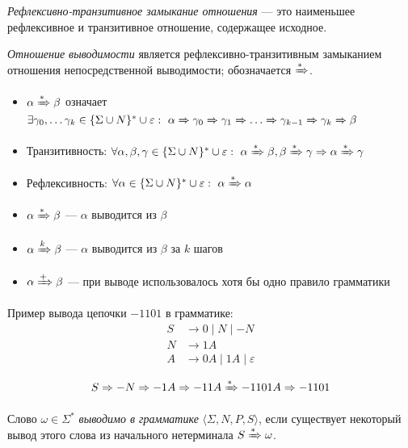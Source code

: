 \begin{definition}
  \textit{Рефлексивно-транзитивное замыкание отношения} --- это наименьшее рефлексивное и транзитивное отношение, содержащее исходное.
\end{definition}

\begin{definition}
\textit{Отношение выводимости} является рефлексивно-транзитивным замыканием отношения непосредственной выводимости; обозначается $\derives$.
\begin{itemize}
  \item $\alpha \derives \beta$ означает $\exists \gamma_0, \dots \gamma_k \in \{\Sigma \cup N\}^* \cup {\varepsilon}: \ \alpha \derives[] \gamma_0 \derives[] \gamma_1 \derives[] \dots \derives[] \gamma_{k-1} \derives[] \gamma_{k} \derives[] \beta$
  \item Транзитивность: $\forall \alpha, \beta, \gamma \in \{\Sigma \cup N\}^* \cup {\varepsilon}: \ \alpha \derives \beta, \beta \derives \gamma \Rightarrow \alpha \derives \gamma$
  \item Рефлексивность: $\forall \alpha \in \{\Sigma \cup N\}^* \cup {\varepsilon}: \ \alpha \derives \alpha$
  \item $\alpha \derives \beta$ --- $\alpha$ выводится из $\beta$
  \item $\alpha \derives[k] \beta$ --- $\alpha$ выводится из $\beta$ за $k$ шагов
  \item $\alpha \derives[+] \beta$ --- при выводе использовалось хотя бы одно правило грамматики
\end{itemize}
\end{definition}


\begin{example}
Пример вывода цепочки $-1101$ в грамматике:
\begin{align*}
  S &\rightarrow 0 \mid N \mid - N  \\
  N &\rightarrow 1 A \\
  A &\rightarrow 0 A \mid 1 A  \mid \varepsilon\\
\end{align*}
\[
  S \Rightarrow - N \Rightarrow - 1 A \Rightarrow - 1 1 A \derives - 1 1 0 1 A \Rightarrow - 1 1 0 1
\]
\end{example}


\begin{definition}
Слово $\omega \in \Sigma^*$ \textit{выводимо в грамматике} $\langle \Sigma, N, P, S \rangle$, если существует некоторый вывод этого слова из начального нетерминала $S \derives \omega$.

\end{definition}

